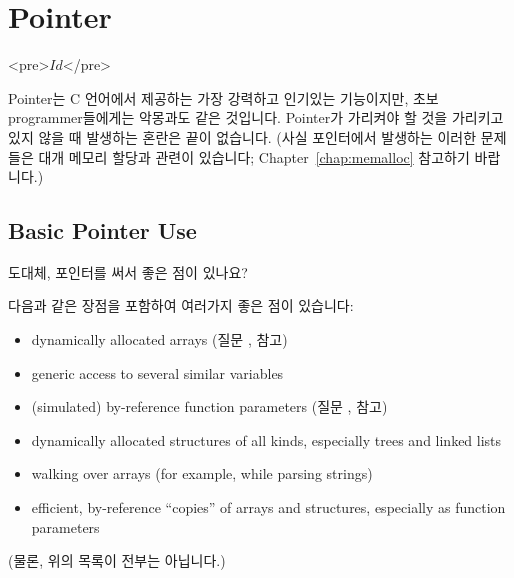 \chapter{Pointer}	\label{chap:pointer}

\begin{rawhtml}
<pre>$Id$</pre>
\end{rawhtml}

Pointer는 C 언어에서 제공하는 가장 강력하고 인기있는 기능이지만,
초보 programmer들에게는 악몽과도 같은 것입니다.
Pointer가 가리켜야 할 것을 가리키고 있지 않을 때 발생하는 혼란은
끝이 없습니다. (사실 포인터에서 발생하는 이러한 문제들은 대개
메모리 할당과 관련이 있습니다; Chapter~\ref{chap:memalloc} 참고하기 바랍니다.)


\section{Basic Pointer Use}

\begin{faq}
	도대체, 포인터를 써서 좋은 점이 있나요?

\A
	다음과 같은 장점을 포함하여 여러가지 좋은 점이 있습니다:
\begin{itemize}
\item
	dynamically allocated arrays (질문 ,  참고)
\item
	generic access to several similar variables
\item
	(simulated) by-reference function parameters (질문 ,  참고)
\item
	dynamically allocated structures of all kinds, especially
	trees and linked lists
\item
	walking over arrays (for example, while parsing strings)
\item
	efficient, by-reference ``copies'' of arrays and structures,
	especially as function parameters
\end{itemize}

	(물론, 위의 목록이 전부는 아닙니다.)

\end{faq}

